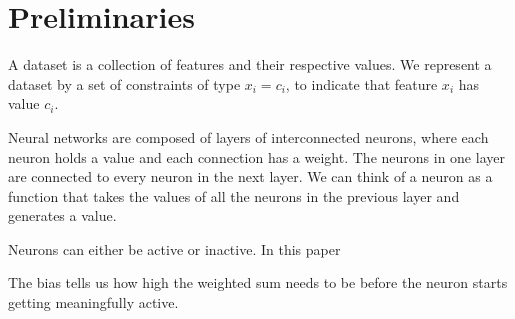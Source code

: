 \documentclass[12pt]{article}
\begin{document}
\section{Preliminaries}



A dataset is a collection of features and their respective values.
We represent a dataset by a set of constraints of type $x_i = c_i$, to indicate that feature $x_i$ has value $c_i$.


Neural networks are composed of layers of interconnected neurons, where each neuron holds a value and each connection has a weight.
The neurons in one layer are connected to every neuron in the next layer.
We can think of a neuron as a function that takes the values of all the neurons in the previous layer and generates a value.

Neurons can either be active or inactive. In this paper


The bias tells us how high the weighted sum needs to be before the neuron starts getting meaningfully active.


\end{document}

